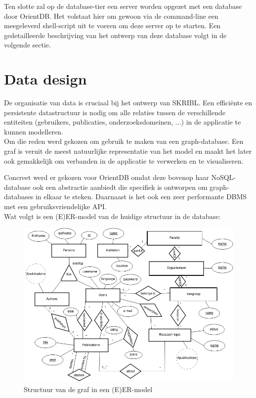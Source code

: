 \documentclass{article}
\begin{document}
Ten slotte zal op de database-tier een server worden opgezet met een database door OrientDB. Het volstaat hier om gewoon via de command-line een meegeleverd shell-script uit te voeren om deze server op te starten.
Een gedetailleerde beschrijving van het ontwerp van deze database volgt in de volgende sectie. 

\clearpage

\section{Data design}

De organisatie van data is cruciaal bij het ontwerp van SKRIBL. Een effici\"ente en persistente datastructuur is nodig om alle relaties tussen de verschillende entiteiten (gebruikers, publicaties, onderzoeksdomeinen, ...) in de applicatie te kunnen modelleren. \\

Om die reden werd gekozen om gebruik te maken van een graph-database. Een graf is veruit de meest natuurlijke representatie van het model en maakt het later ook gemakkelijk om verbanden in de applicatie te verwerken en te visualiseren. 

Concreet werd er gekozen voor OrientDB omdat deze bovenop haar NoSQL-database ook een abstractie aanbiedt die specifiek is ontworpen om graph-databases in elkaar te steken. Daarnaast is het ook een zeer performante DBMS met een gebruiksvriendelijke API. \\

Wat volgt is een (E)ER-model van de huidige structuur in de database:

\begin{figure}[!h]
\centering
 \includegraphics[width=149mm]{ER-model.png}
 \caption{Structuur van de graf in een (E)ER-model}
 \label{ER-model}
\end{figure}
\end{document}
